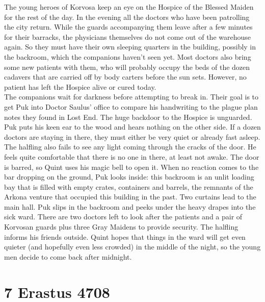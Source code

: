 The young heroes of Korvosa keep an eye on the Hospice of the Blessed Maiden for the rest of the day. In the evening all the doctors who have been patrolling the city return. While the guards accompanying them leave after a few minutes for their barracks, the physicians themselves do not come out of the warehouse again. So they must have their own sleeping quarters in the building, possibly in the backroom, which the companions haven't seen yet. Most doctors also bring some new patients with them, who will probably occupy the beds of the dozen cadavers that are carried off by body carters before the sun sets. However, no patient has left the Hospice alive or cured today.\\

The companions wait for darkness before attempting to break in. Their goal is to get Puk into Doctor Saulus' office to compare his handwriting to the plague plan notes they found in Lost End. The huge backdoor to the Hospice is unguarded. Puk puts his keen ear to the wood and hears nothing on the other side. If a dozen doctors are staying in there, they must either be very quiet or already fast asleep. The halfling also fails to see any light coming through the cracks of the door. He feels quite comfortable that there is no one in there, at least not awake. The door is barred, so Quint uses his magic bell to open it. When no reaction comes to the bar dropping on the ground, Puk looks inside: this backroom is an unlit loading bay that is filled with empty crates, containers and barrels, the remnants of the Arkona venture that occupied this building in the past. Two curtains lead to the main hall. Puk slips in the backroom and peeks under the heavy drapes into the sick ward. There are two doctors left to look after the patients and a pair of Korvosan guards plus three Gray Maidens to provide security. The halfling informs his friends outside. Quint hopes that things in the ward will get even quieter (and hopefully even less crowded) in the middle of the night, so the young men decide to come back after midnight.\\

\section{7 Erastus 4708}

